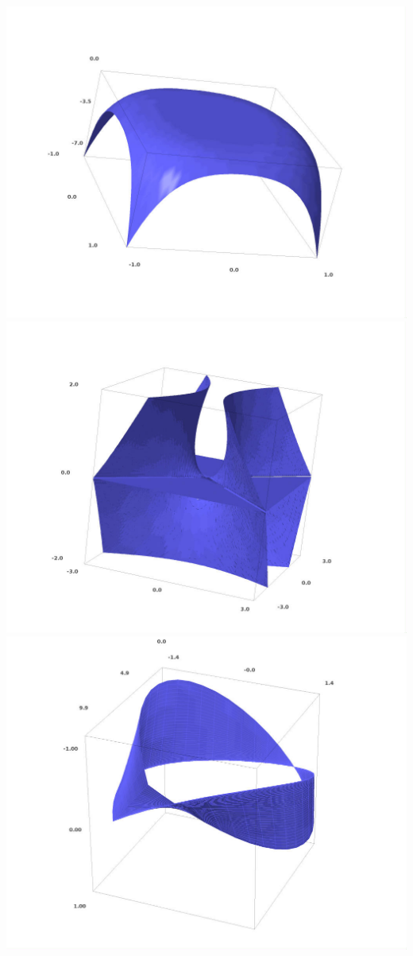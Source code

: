\documentclass[class=report,crop=false]{standalone}
\begin{document}
\begin{center}
\includegraphics[scale=0.2]{figures/surface_1.jpg} 
\includegraphics[scale=0.2]{figures/surface_2.jpg} \\ 
\includegraphics[scale=0.2]{figures/surface_3.jpg} \\

\end{center}
\end{document}
